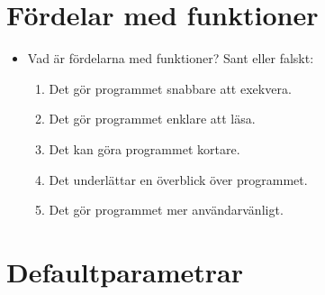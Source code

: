 \mode*

\section{Fördelar med funktioner}

\begin{frame}[fragile]
  \begin{question}
    \begin{itemize}
      \item Vad är fördelarna med funktioner? Sant eller falskt:
        \begin{enumerate}
          \item<+> Det gör programmet snabbare att exekvera.
          \item<+> Det gör programmet enklare att läsa.
          \item<+> Det kan göra programmet kortare.
          \item<+> Det underlättar en överblick över programmet.
          \item<+> Det gör programmet mer användarvänligt.
        \end{enumerate}
    \end{itemize}
  \end{question}
\end{frame}


\section{Defaultparametrar}

\begin{frame}[fragile]
  \begin{example}
    \inputminted{python}{examples/hello.py}
  \end{example}
\end{frame}

